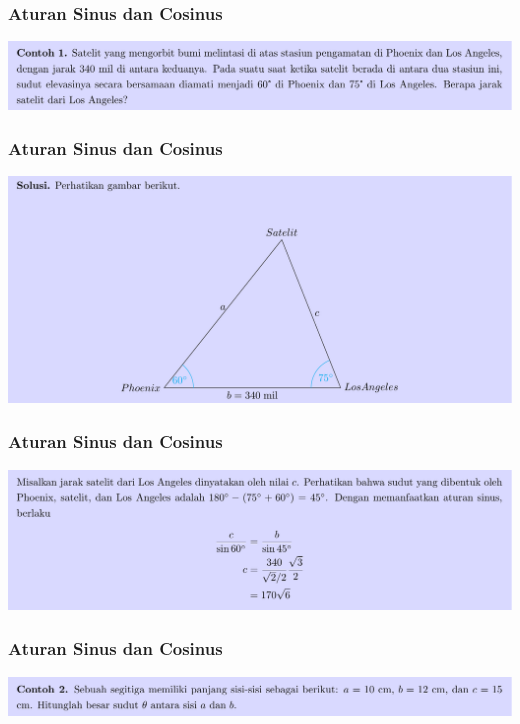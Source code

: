 \documentclass[pdflatex,compress,mathserif]{beamer}
\begin{document}
\begin{frame}
	\frametitle{Aturan Sinus dan Cosinus}
	\begin{center}
		\includegraphics[width=\linewidth]{img/img24}
	\end{center}
\end{frame}

\begin{frame}
	\frametitle{Aturan Sinus dan Cosinus}
	\begin{center}
		\includegraphics[width=\linewidth]{img/img25}
	\end{center}
\end{frame}

\begin{frame}
	\frametitle{Aturan Sinus dan Cosinus}
	\begin{center}
		\includegraphics[width=\linewidth]{img/img26}
	\end{center}
\end{frame}

\begin{frame}
	\frametitle{Aturan Sinus dan Cosinus}
	\begin{center}
		\includegraphics[width=\linewidth]{img/img27}
	\end{center}
\end{frame}
\end{document}

